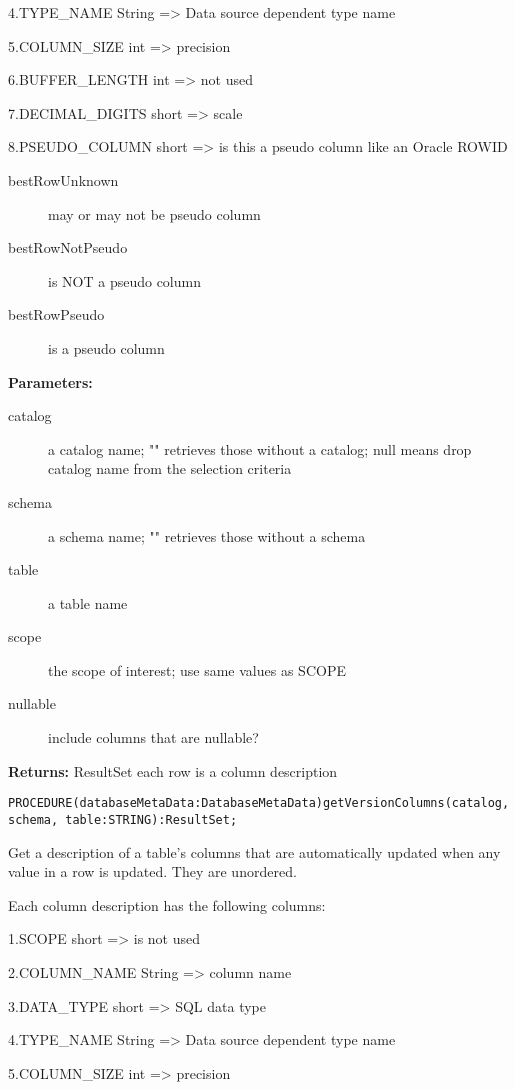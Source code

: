 4.TYPE\_NAME String => Data source dependent type name 

5.COLUMN\_SIZE int => precision 

6.BUFFER\_LENGTH int => not used 

7.DECIMAL\_DIGITS short => scale 

8.PSEUDO\_COLUMN short => is this a pseudo column like an Oracle ROWID 
\begin{description}
\item[bestRowUnknown] may or may not be pseudo column 
\item[bestRowNotPseudo] is NOT a pseudo column 
\item[bestRowPseudo] is a pseudo column 
\end{description}



{\bf Parameters: }
\begin{description}
\item[catalog] a catalog name; "" retrieves those without a catalog; null means drop catalog name from the selection criteria 
\item[schema] a schema name; "" retrieves those without a schema 
\item[table] a table name 
\item[scope] the scope of interest; use same values as SCOPE 
\item[nullable] include columns that are nullable? 
\end{description}

{\bf Returns: } 
ResultSet each row is a column description 




\verb'PROCEDURE(databaseMetaData:DatabaseMetaData)getVersionColumns(catalog, schema, table:STRING):ResultSet;'





Get a description of a table's columns that are automatically updated when any value in a row is updated. They are unordered. 

Each column description has the following columns: 

1.SCOPE short => is not used 

2.COLUMN\_NAME String => column name 

3.DATA\_TYPE short => SQL data type 

4.TYPE\_NAME String => Data source dependent type name 

5.COLUMN\_SIZE int => precision 

